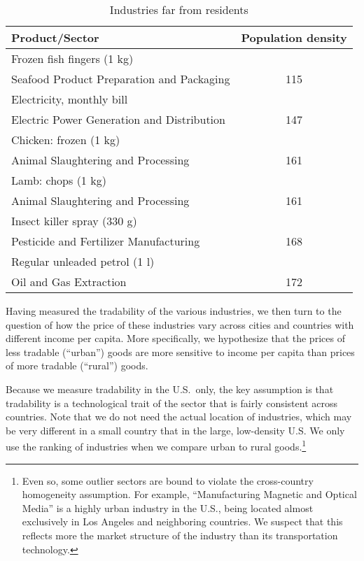 \documentclass[12pt]{article}
\begin{document}
\begin{table}[ht!]
\center
\caption{Industries far from residents}
\label{tab:furthest}
\begin{tabular}{lc}
  \hline
  Product/Sector & Population density\\
  \hline
  Frozen fish fingers (1 kg)\\
  \hspace*{1em}Seafood Product Preparation and Packaging &115\\
  Electricity, monthly bill\\
  \hspace*{1em}Electric Power Generation and Distribution & 147\\
  Chicken: frozen (1 kg)\\
  \hspace*{1em}Animal Slaughtering and Processing & 161\\
  Lamb: chops (1 kg)\\
  \hspace*{1em}Animal Slaughtering and Processing & 161\\
  Insect killer spray (330 g)\\
  \hspace*{1em}Pesticide and Fertilizer Manufacturing & 168\\
  Regular unleaded petrol (1 l)\\
  \hspace*{1em}Oil and Gas Extraction & 172\\
  \hline
\end{tabular}
\end{table}

\bigskip

Having measured the tradability of the various industries, we then turn to the question of how the price of these industries vary across cities and countries with different income per capita. More specifically, we hypothesize that the prices of less tradable (``urban'') goods are more sensitive to income per capita than prices of more tradable (``rural'') goods.

Because we measure tradability in the U.S.~only, the key assumption is that tradability is a technological trait of the sector that is fairly consistent across countries. Note that we do not need the actual location of industries, which may be very different in a small country that in the large, low-density U.S. We only use the ranking of industries when we compare urban to rural goods.\footnote{Even so, some outlier sectors are bound to violate the cross-country homogeneity assumption. For example, ``Manufacturing Magnetic and Optical Media'' is a highly urban industry in the U.S., being located almost exclusively in Los Angeles and neighboring countries. We suspect that this reflects more the market structure of the industry than its transportation technology.}
\end{document}
